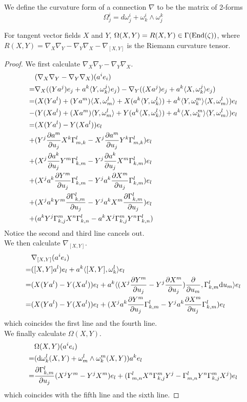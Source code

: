 	\begin{defn}
		We define the curvature form of a connection $\nabla$ to be the matrix of 2-forms
		\[ \Omega^i_j=d\omega^i_j+\omega^i_k\wedge\omega^k_j \]
	\end{defn}
	\begin{prop}
		For tangent vector fields $X$ and $Y$, $\Omega(X,Y)=R(X,Y)\in\Gamma(\operatorname{\mathrm{End}}(\zeta))$, where $R(X,Y)=\nabla_X\nabla_Y-\nabla_Y\nabla_X-\nabla_{[X,Y]}$ is the Riemann curvature tensor. 
	\end{prop}
	\begin{proof}
		We first calculate $\nabla_X\nabla_Y-\nabla_Y\nabla_X$. 
		\begin{align*}
			&(\nabla_X\nabla_Y - \nabla_Y\nabla_X)(a^ie_i) \\
			=&\nabla_X((Ya^j)e_j + a^k\langle Y,\omega^j_k\rangle e_j) - \nabla_Y((Xa^j)e_j + a^k\langle X,\omega^j_k\rangle e_j) \\
			=&(X(Ya^l) + (Ya^m)\langle X,\omega^l_m\rangle + X(a^k\langle Y,\omega^l_k\rangle) + a^k\langle Y,\omega^m_k\rangle\langle X,\omega^l_m\rangle)e_l \\
			-&(Y(Xa^l) + (Xa^m)\langle Y,\omega^l_m\rangle + Y(a^k\langle X,\omega^l_k\rangle) + a^k\langle X,\omega^m_k\rangle\langle Y,\omega^l_m\rangle)e_l \\
			=&(X(Ya^l) - Y(Xa^l))e_l \\
			+&(Y^j\frac{\partial a^m}{\partial u_j}X^k\Gamma^l_{m,k} - X^j\frac{\partial a^m}{\partial u_j}Y^k\Gamma^l_{m,k})e_l \\
			+&(X^j\frac{\partial a^k}{\partial u_j}Y^m\Gamma^l_{k,m} - Y^j\frac{\partial a^k}{\partial u_j}X^m\Gamma^l_{k,m})e_l \\
			+&(X^ja^k\frac{\partial Y^m}{\partial u_j}\Gamma^l_{k,m} - Y^ja^k\frac{\partial X^m}{\partial u_j}\Gamma^l_{k,m})e_l \\
			+&(X^ja^kY^m\frac{\partial \Gamma^l_{k,m}}{\partial u_j} - Y^ja^kX^m\frac{\partial \Gamma^l_{k,m}}{\partial u_j})e_l \\
			+&(a^kY^j\Gamma^m_{k,j}X^n\Gamma^l_{k,n} - a^kX^j\Gamma^m_{k,j}Y^n\Gamma^l_{k,n})
		\end{align*}
		Notice the second and third line cancels out. \\
		We then calculate $\nabla_{[X,Y]}$. 
		\begin{align*}
			&\nabla_{[X,Y]}(a^ie_i) \\
			=&([X,Y]a^l)e_l + a^k\langle[X,Y],\omega^l_k\rangle e_l \\
			=&(X(Ya^l) - Y(Xa^l))e_l + a^k\langle(X^j\frac{\partial Y^m}{\partial u_j}-Y^j\frac{\partial X^m}{\partial u_j})\frac{\partial }{\partial u_m},\Gamma^l_{k,m}\mathrm{d} u_m\rangle e_l \\
			=&(X(Ya^l) - Y(Xa^l))e_l + (X^ja^k\frac{\partial Y^m}{\partial u_j}\Gamma^l_{k,m} - Y^ja^k\frac{\partial X^m}{\partial u_j}\Gamma^l_{k,m})e_l
		\end{align*}
		which coincides the first line and the fourth line. \\
		We finally calculate $\Omega(X,Y)$. 
		\begin{align*}
			&\Omega(X,Y)(a^ie_i) \\
			=&(\mathrm{d}\omega^l_k(X,Y)+\omega^l_m\wedge\omega^m_k(X,Y))a^ke_l \\
			=&\frac{\partial \Gamma^l_{k,m}}{\partial u_j}(X^jY^m-Y^jX^m)e_l + (\Gamma^l_{m,n}X^n\Gamma^m_{k,j}Y^j - \Gamma^l_{m,n}Y^n\Gamma^m_{k,j}X^j) e_l
		\end{align*}
		which coincides with the fifth line and the sixth line.  
	\end{proof}
